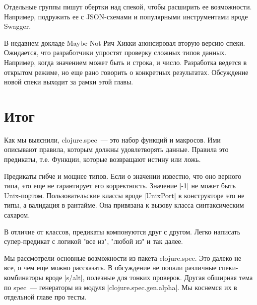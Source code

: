 Отдельные группы пишут обертки над спекой, чтобы расширить ее
возможности. Например, подружить ее с JSON-схемами и популярными инструментами
вроде Swagger.

В недавнем докладе Maybe Not Рич Хикки анонсировал вторую версию
спеки. Ожидается, что разработчики упростят проверку сложных типов
данных. Например, когда значением может быть и строка, и число. Разработка
ведется в открытом режиме, но еще рано говорить о конкретных
результатах. Обсуждение новой спеки выходит за рамки этой главы.

\section{Итог}

Как мы выяснили, clojure.spec~--- это набор функций и макросов. Ими описывают
правила, которым должны удовлетворять данные. Правила это предикаты,
т.е. Функции, которые возвращают истину или ложь.

Предикаты гибче и мощнее типов. Если о значении известно, что оно верного типа,
это еще не гарантирует его корректность. Значение \spverb|-1| не может быть
Unix-портом. Пользовательские классы вроде \spverb|UnixPort| в конструкторе это не
типы, а валидация в рантайме. Она привязана к вызову класса синтаксическим
сахаром.

В отличие от классов, предикаты компонуются друг с другом. Легко написать
супер-предикат с логикой "все из", "любой из" и так далее.

Мы рассмотрели основные возможности из пакета clojure.spec. Это далеко не все, о
чем еще можно рассказать. В обсуждение не попали различные спеки-комбинаторы
вроде \spverb|s/alt|, полезные для тонких проверок. Другая обширная тема по spec~---
генераторы из модуля \spverb|clojure.spec.gen.alpha|. Мы коснемся их в отдельной главе
про тесты.
